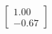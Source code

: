 \documentclass[preview]{standalone}
\begin{document}
\begin{align*}
\begin{bmatrix} 1.00 \\ -0.67 \end{bmatrix}
\end{align*}
\end{document}
